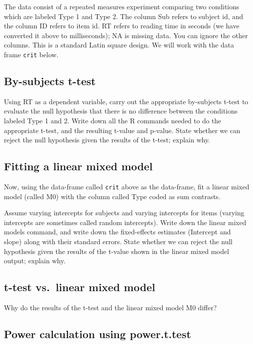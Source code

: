\documentclass[12pt,]{krantz}
\begin{document}
The data consist of a repeated measures experiment comparing two conditions which are labeled Type 1 and Type 2. The column Sub refers to subject id, and the column ID refers to item id. RT refers to reading time in seconds (we have converted it above to milliseconds); NA is missing data. You can ignore the other columns. This is a standard Latin square design. We will work with the data frame \texttt{crit} below.

\hypertarget{sec:LMExercisesPart1}{%
\subsection{By-subjects t-test}\label{sec:LMExercisesPart1}}

Using RT as a dependent variable, carry out the appropriate by-subjects t-test to evaluate the null hypothesis that there is no difference between the conditions labeled Type 1 and 2. Write down all the R commands needed to do the appropriate t-test, and the resulting t-value and p-value. State whether we can reject the null hypothesis given the results of the t-test; explain why.

\hypertarget{sec:LMExercisesPart2}{%
\subsection{Fitting a linear mixed model}\label{sec:LMExercisesPart2}}

Now, using the data-frame called \texttt{crit} above as the data-frame, fit a linear mixed model (called M0) with the column called Type coded as sum contrasts.

Assume varying intercepts for subjects and varying intercepts for items (varying intercepts are sometimes called random intercepts). Write down the linear mixed models command, and write down the fixed-effects estimates (Intercept and slope) along with their standard errors. State whether we can reject the null hypothesis given the results of the t-value shown in the linear mixed model output; explain why.

\hypertarget{sec:LMExercisesPart3}{%
\subsection{t-test vs.~linear mixed model}\label{sec:LMExercisesPart3}}

Why do the results of the t-test and the linear mixed model M0 differ?

\hypertarget{sec:LMExercisesPart4}{%
\subsection{Power calculation using power.t.test}\label{sec:LMExercisesPart4}}
\end{document}
